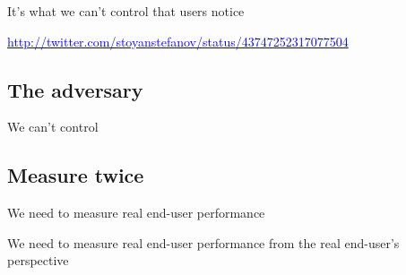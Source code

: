 \documentclass{beamer}
\begin{document}
\begin{frame}{It's what we can't control that users notice}
  \parbox[c][1.2\paperheight]{\paperwidth}{ }
  \hfill \tiny{\href{http://twitter.com/stoyanstefanov/status/43747252317077504}{\textcolor{blue}{http://twitter.com/stoyanstefanov/status/43747252317077504}}}
\end{frame}

\subsection{The adversary}

\begin{frame}{We can't control}
  \begin{center}
  \LARGE{
  }
  \end{center}
\end{frame}

\subsection{Measure twice}

\begin{frame}{}
  \begin{center}
  We need to measure real end-user performance
  \end{center}
\end{frame}

\begin{frame}{}
  \begin{center}
  We need to measure real end-user performance from the real end-user's perspective
  \end{center}
\end{frame}

\begin{frame}{}
\end{frame}
\end{document}
